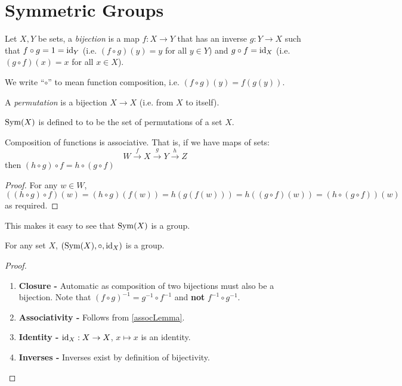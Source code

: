 \documentclass[../main.tex]{subfiles}
\begin{document}
\section{Symmetric Groups}
\begin{definition}[Bijection]
  Let $X, Y$ be sets, a \textit{bijection} is a map $f: X \to Y$ that has an inverse $g: Y \to X$ such that $f \circ g = 1=\mathrm{id}_Y$ (i.e. $(f \circ g)(y) = y$ for all $y \in Y$) and $g \circ f = \mathrm{id}_X$ (i.e. $(g \circ f)(x) = x$ for all $x \in X$).
\end{definition}
\begin{remark}[Notation]
  We write ``$\circ$'' to mean function composition, i.e. $(f \circ g)(y) = f(g(y))$.
\end{remark}
\begin{definition}[Permutation]
  A \textit{permutation} is a bijection $X \to X$ (i.e. from $X$ to itself).
\end{definition}
\begin{definition}
  $\operatorname{Sym}(X)$ is defined to to be the set of permutations of a set $X$.
\end{definition}
\begin{lemma}
  Composition of functions is associative.
  That is, if we have maps of sets:
  \[
    W \xrightarrow{f} X \xrightarrow{g} Y \xrightarrow{h} Z
  \]
  then $(h \circ g) \circ f = h \circ (g \circ f)$
  \label{assocLemma}
\end{lemma}
\begin{proof}
For any $w \in W$,
  \[
    ((h \circ g) \circ f)(w) = (h \circ g)(f(w)) = h(g(f(w))) = h((g \circ f)(w)) = (h \circ (g \circ f))(w)
  \]
  as required.
\end{proof}
This makes it easy to see that $\operatorname{Sym}(X)$ is a group.
\begin{proposition}
  For any set $X$, $(\operatorname{Sym}(X), \circ, \mathrm{id}_X)$ is a group.
\end{proposition}
\begin{proof}
  \begin{enumerate}
    \item \textbf{Closure -} Automatic as composition of two bijections must also be a bijection.
      Note that $(f \circ g)^{-1} = g^{-1} \circ f^{-1}$ and \textbf{not} $f^{-1} \circ g^{-1}$.
    \item \textbf{Associativity -} Follows from \cref{assocLemma}.
    \item \textbf{Identity -} $\mathrm{id}_X: X \to X$, $x \mapsto x$ is an identity.
    \item \textbf{Inverses -} Inverses exist by definition of bijectivity.
  \end{enumerate}
\end{proof}
\end{document}
